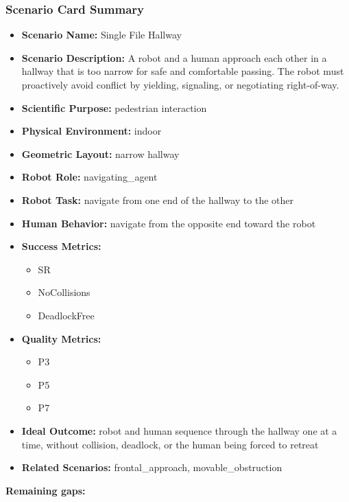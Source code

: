 \documentclass[utf8]{frontiers_suppmat} %
\providecommand{\tightlist}{%
  \setlength{\itemsep}{0pt}\setlength{\parskip}{0pt}}
\begin{document}
\subsubsection{Scenario Card Summary}\label{scenario-card-summary}

\begin{itemize}
\tightlist
\item
  \textbf{Scenario Name:} Single File Hallway
\item
  \textbf{Scenario Description:} A robot and a human approach each other
  in a hallway that is too narrow for safe and comfortable passing. The
  robot must proactively avoid conflict by yielding, signaling, or
  negotiating right-of-way.
\item
  \textbf{Scientific Purpose:} pedestrian interaction
\item
  \textbf{Physical Environment:} indoor
\item
  \textbf{Geometric Layout:} narrow hallway
\item
  \textbf{Robot Role:} navigating\_agent
\item
  \textbf{Robot Task:} navigate from one end of the hallway to the other
\item
  \textbf{Human Behavior:} navigate from the opposite end toward the
  robot
\item
  \textbf{Success Metrics:}

  \begin{itemize}
  \tightlist
  \item
    SR
  \item
    NoCollisions
  \item
    DeadlockFree
  \end{itemize}
\item
  \textbf{Quality Metrics:}

  \begin{itemize}
  \tightlist
  \item
    P3
  \item
    P5
  \item
    P7
  \end{itemize}
\item
  \textbf{Ideal Outcome:} robot and human sequence through the hallway
  one at a time, without collision, deadlock, or the human being forced
  to retreat
\item
  \textbf{Related Scenarios:} frontal\_approach, movable\_obstruction
\end{itemize}

\textbf{Remaining gaps:}
\end{document}
